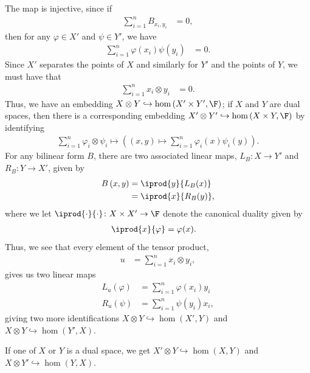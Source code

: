 \documentclass[10pt]{mypackage}
\begin{document}
The map is injective, since if
\begin{align*}
  \sum_{i=1}^{n}B_{x_i,y_i} &= 0,
\end{align*}
then for any $\varphi\in X'$ and $\psi\in Y'$, we have
\begin{align*}
  \sum_{i=1}^{n}\varphi\left(x_i\right)\psi\left( y_i \right) &= 0.
\end{align*}
Since $X'$ separates the points of $X$ and similarly for $Y'$ and the points of $Y$, we must have that
\begin{align*}
  \sum_{i=1}^{n}x_i\otimes y_i &= 0.
\end{align*}
Thus, we have an embedding $X\otimes Y\hookrightarrow \hom\left( X'\times Y',\F \right)$; if $X$ and $Y$ are dual spaces, then there is a corresponding embedding $X'\otimes Y'\hookrightarrow \hom\left( X\times Y,\F \right)$ by identifying
\begin{align*}
  \sum_{i=1}^{n}\varphi_i\otimes \psi_i \mapsto \left( \left( x,y \right)\mapsto \sum_{i=1}^{n}\varphi_i(x)\psi_i(y) \right).
\end{align*}
For any bilinear form $B$, there are two associated linear maps, $L_B\colon X\rightarrow Y'$ and $R_B\colon Y\rightarrow X'$, given by
\begin{align*}
  B\left( x,y \right) &= \iprod{y}{L_B(x)}\\
                      &= \iprod{x}{R_B(y)},
\end{align*}
where we let $ \iprod{\cdot}{\cdot}\colon X\times X'\rightarrow \F$ denote the canonical duality given by
\begin{align*}
  \iprod{x}{\varphi} &= \varphi(x).
\end{align*}
Thus, we see that every element of the tensor product,
\begin{align*}
  u &= \sum_{i=1}^{n}x_i\otimes y_i,
\end{align*}
gives us two linear maps
\begin{align*}
  L_u\left( \varphi \right) &= \sum_{i=1}^{n}\varphi\left( x_i \right)y_i\\
  R_u\left( \psi \right) &= \sum_{i=1}^{n} \psi\left( y_i \right)x_i,
\end{align*}
giving two more identifications $X\otimes Y\hookrightarrow \hom\left( X',Y \right)$ and $X\otimes Y\hookrightarrow \hom\left( Y',X \right)$.

If one of $X$ or $Y$ is a dual space, we get $X'\otimes Y\hookrightarrow \hom\left( X,Y \right)$ and $X\otimes Y'\hookrightarrow \hom\left( Y,X \right)$. 
\end{document}
